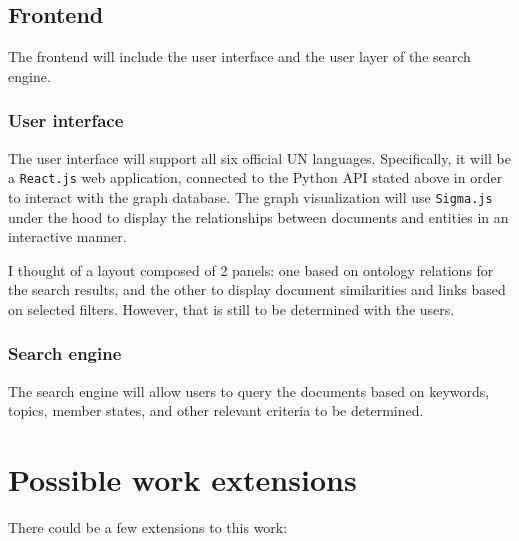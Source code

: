 \documentclass[11pt]{article}
\begin{document}
\subsection{Frontend} \label{frontend}

The frontend will include the user interface and the user layer of the search engine.

\subsubsection{User interface} \label{ui}

The user interface will support all six official UN languages. Specifically, it will be a  \texttt{React.js} web application, connected to the Python API stated above in order to interact with the graph database. The graph visualization will use \texttt{Sigma.js} under the hood to display the relationships between documents and entities in an interactive manner.

I thought of a layout composed of 2 panels: one based on ontology relations for the search results, and the other to display document similarities and links based on selected filters. However, that is still to be determined with the users.

\subsubsection{Search engine} \label{search-engine}

The search engine will allow users to query the documents based on keywords, topics, member states, and other relevant criteria to be determined.

\section{Possible work extensions} \label{future-work}

There could be a few extensions to this work:
\end{document}
